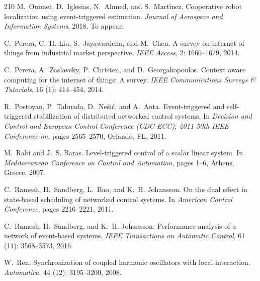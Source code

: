 \documentclass{autart}
\begin{document}
{\begin{thebibliography}{210}
M.~Ouimet, D.~Iglesias, N.~Ahmed, and S.~Mart{\'\i}nez.
\newblock Cooperative robot localization using event-triggered estimation.
\newblock \emph{Journal of Aerospace and Information Systems}, 2018.
\newblock To appear.

C.~Perera, C.~H. Liu, S.~Jayawardena, and M.~Chen.
\newblock A survey on internet of things from industrial market perspective.
\newblock \emph{IEEE Access}, 2: 1660--1679, 2014{}.

C.~Perera, A.~Zaslavsky, P.~Christen, and D.~Georgakopoulos.
\newblock Context aware computing for the internet of things: A survey.
\newblock \emph{IEEE Communications Surveys \& Tutorials}, 16
  (1): 414--454, 2014{}.

R.~Postoyan, P.~Tabuada, D.~Ne{\v{s}}i{\'c}, and A.~Anta.
\newblock Event-triggered and self-triggered stabilization of distributed
  networked control systems.
\newblock In \emph{Decision and Control and European Control Conference
  (CDC-ECC), 2011 50th IEEE Conference on}, pages 2565--2570, Orlando, FL,
  2011.

M.~Rabi and J.~S. Baras.
\newblock Level-triggered control of a scalar linear system.
\newblock In \emph{Mediterranean Conference on Control and Automation}, pages
  1--6, Athens, Greece, 2007.

C.~Ramesh, H.~Sandberg, L.~Bao, and K.~H. Johansson.
\newblock On the dual effect in state-based scheduling of networked control
  systems.
\newblock In \emph{{A}merican {C}ontrol {C}onference}, pages 2216--2221, 2011.

C.~Ramesh, H.~Sandberg, and K.~H. Johansson.
\newblock Performance analysis of a network of event-based systems.
\newblock \emph{IEEE Transactions on Automatic Control}, 61
  (11): 3568--3573, 2016.

W.~Ren.
\newblock Synchronization of coupled harmonic oscillators with local
  interaction.
\newblock \emph{Automatica}, 44 (12): 3195--3200,
  2008{}.


\end{thebibliography}}
\end{document}
